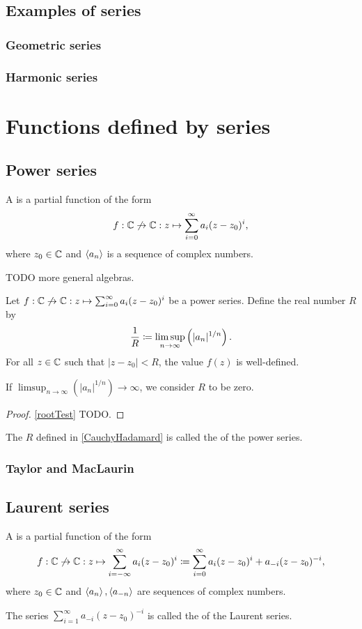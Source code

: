 \subsection{Examples of series}
\subsubsection{Geometric series}
\subsubsection{Harmonic series}

\section{Functions defined by series}
\subsection{Power series}
\begin{definition}
A  is a partial function of the form
\[ f: \mathbb{C}\not\to \mathbb{C}: z\mapsto \sum_{i=0}^\infty a_i(z-z_0)^i, \]
where $z_0\in \mathbb{C}$ and $\left\langle a_n \right\rangle$ is a sequence of complex numbers. 
\end{definition}
TODO more general algebras.

\begin{proposition} \label{CauchyHadamard}
Let $f: \mathbb{C}\not\to \mathbb{C}: z\mapsto \sum_{i=0}^\infty a_i(z-z_0)^i$ be a power series. Define the real number $R$ by
\[ \frac{1}{R} \coloneqq \limsup_{n\to\infty}\left(|a_n|^{1/n}\right). \]
For all $z\in \mathbb{C}$ such that $|z-z_0| < R$, the value $f(z)$ is well-defined.
\end{proposition}
If $\limsup_{n\to\infty}\left(|a_n|^{1/n}\right) \to \infty$, we consider $R$ to be zero.
\begin{proof}
\ref{rootTest} TODO.
\end{proof} 

\begin{definition}
The $R$ defined in \ref{CauchyHadamard} is called the  of the power series.
\end{definition}

\subsubsection{Taylor and MacLaurin}
\subsection{Laurent series}
\begin{definition}
A  is a partial function of the form
\[ f: \mathbb{C}\not\to \mathbb{C}: z\mapsto \sum_{i=-\infty}^\infty a_i(z-z_0)^i \coloneqq \sum_{i=0}^\infty a_i(z-z_0)^i + a_{-i}(z-z_0)^{-i}, \]
where $z_0\in \mathbb{C}$ and $\left\langle a_n \right\rangle, \left\langle a_{-n} \right\rangle$ are sequences of complex numbers.

The series $\sum_{i=1}^\infty a_{-i}(z-z_0)^{-i}$ is called the  of the Laurent series.
\end{definition}

